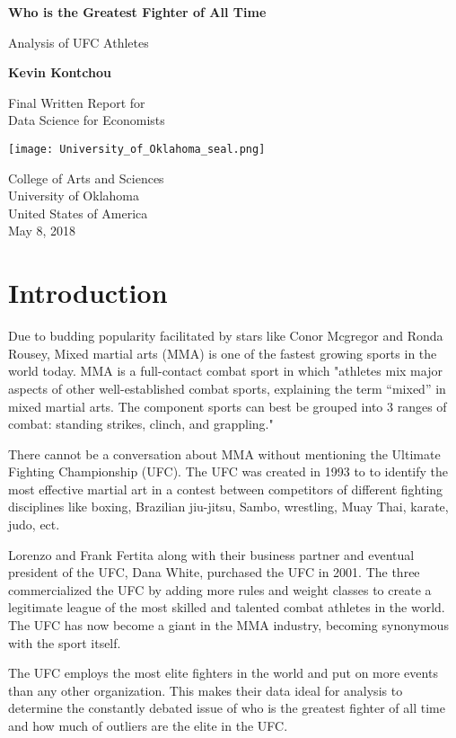 \documentclass[12pt,english]{report}
\begin{document}
\begin{titlepage}
    \begin{center}
        \vspace*{0.5cm}
        \Large
        \textbf{Who is the Greatest Fighter of All Time}
        
        \vspace{0.5cm}
        Analysis of UFC Athletes
        
        \vspace{1.5cm}
        
        \textbf{Kevin Kontchou}
        
        \vfill
        
        Final Written Report for \\
        Data Science for Economists 
        
        \vspace{0.8cm}
        
        \texttt{[image: University\_of\_Oklahoma\_seal.png]}
        
        College of Arts and Sciences\\
        University of Oklahoma\\
        United States of America\\
        May 8, 2018
        
    \end{center}
\end{titlepage}
\section{Introduction}
\setlength{\parindent}{3em}
\par Due to budding popularity facilitated by stars like Conor Mcgregor and Ronda Rousey, Mixed martial arts (MMA) is one of the fastest growing sports in the world today. MMA is a full-contact combat sport in which "athletes mix major aspects of other well-established combat sports, explaining the term “mixed” in mixed martial arts. The component sports can best be grouped into 3 ranges of combat: standing strikes, clinch, and grappling." \cite{qiao_ji2017}\par There cannot be a conversation about MMA without mentioning the Ultimate Fighting Championship (UFC). The UFC was created in 1993 to to identify the most effective martial art in a contest  between competitors of different fighting disciplines like boxing, Brazilian jiu-jitsu, Sambo, wrestling, Muay Thai, karate, judo, ect. \cite{qiao_ji2017} \par Lorenzo and Frank Fertita along with their business partner and eventual president of the UFC, Dana White, purchased the UFC in 2001. The three commercialized the UFC by adding more rules and weight classes to create a legitimate league of the most skilled and talented combat athletes in the world. The UFC has now become a giant in the MMA industry, becoming synonymous with the sport itself.  \par  The UFC employs the most elite fighters in the world and put on more events than any other organization. This makes their data ideal for analysis to determine the constantly debated issue of who is the greatest fighter of all time and how much of outliers are the elite in the UFC.
\end{document}
